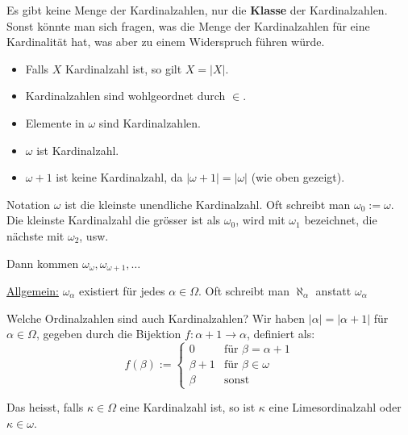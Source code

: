\documentclass[12pt]{article}
\begin{document}
\begin{remark}{}{}
    Es gibt keine Menge der Kardinalzahlen, nur die \textbf{Klasse} der Kardinalzahlen. Sonst könnte man sich fragen, was die Menge der Kardinalzahlen für eine Kardinalität hat, was aber zu einem Widerspruch führen würde.
\end{remark}

\begin{remark}{}{}
    \begin{itemize}
        \item Falls $X$ Kardinalzahl ist, so gilt $X = |X|$.
        \item Kardinalzahlen sind wohlgeordnet durch $\in$.
    \end{itemize}
\end{remark}

\begin{example}{}{}
    \begin{itemize}
        \item Elemente in $\omega$ sind Kardinalzahlen.
        \item $\omega$ ist Kardinalzahl.
        \item $\omega + 1$ ist keine Kardinalzahl, da $|\omega + 1| = |\omega|$ (wie oben gezeigt).
    \end{itemize}
\end{example}

\begin{notebox}{Notation}{}
    $\omega$ ist die kleinste unendliche Kardinalzahl. Oft schreibt man $\omega_0 := \omega$. Die kleinste Kardinalzahl die grösser ist als $\omega_0$, wird mit $\omega_1$ bezeichnet, die nächste mit $\omega_2$, usw.

    Dann kommen $\omega_\omega, \omega_{\omega + 1}, \dots$

    \underline{Allgemein:} $\omega_\alpha$ existiert für jedes $\alpha \in \Omega$. Oft schreibt man $\aleph_\alpha$ anstatt $\omega_\alpha$
\end{notebox}

\begin{remark}{Welche Ordinalzahlen sind auch Kardinalzahlen?}{}
    Wir haben $|\alpha| = |\alpha + 1|$  für $\alpha \in \Omega$, gegeben durch die Bijektion $f: \alpha + 1 \rightarrow \alpha$, definiert als:
    $$
        f(\beta) := \begin{cases}
            0 & \text{für } \beta = \alpha + 1 \\
            \beta + 1 & \text{für } \beta \in \omega \\
            \beta & \text{sonst}
        \end{cases}
    $$

    Das heisst, falls $\kappa \in \Omega$ eine Kardinalzahl ist, so ist $\kappa$ eine Limesordinalzahl oder $\kappa \in \omega$.
\end{remark}
\end{document}
